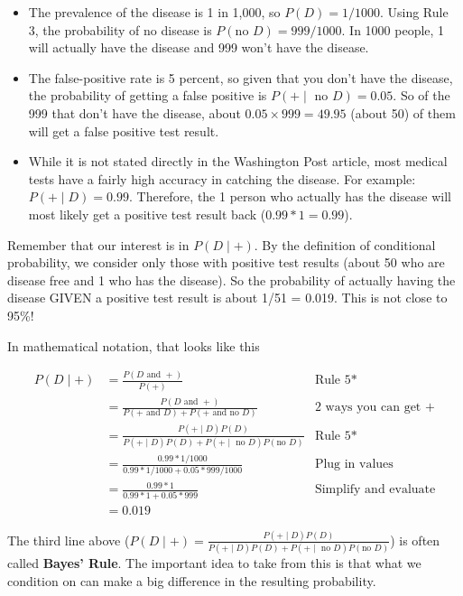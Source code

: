 \documentclass[]{book}
\begin{document}
\begin{itemize}
\item
  The prevalence of the disease is 1 in 1,000, so \(P(D) = 1/1000\). Using Rule 3, the probability of no disease is \(P(\text{no }D) = 999/1000\). In 1000 people, 1 will actually have the disease and 999 won't have the disease.
\item
  The false-positive rate is 5 percent, so given that you don't have the disease, the probability of getting a false positive is \(P(+ \mid\text{ no } D) = 0.05\). So of the 999 that don't have the disease, about \(0.05\times 999 = 49.95\) (about 50) of them will get a false positive test result.
\item
  While it is not stated directly in the Washington Post article, most medical tests have a fairly high accuracy in catching the disease. For example: \(P(+ \mid D) = 0.99\). Therefore, the 1 person who actually has the disease will most likely get a positive test result back (\(0.99*1 = 0.99\)).
\end{itemize}

Remember that our interest is in \(P(D \mid +)\). By the definition of conditional probability, we consider only those with positive test results (about 50 who are disease free and 1 who has the disease). So the probability of actually having the disease GIVEN a positive test result is about 1/51 = 0.019. This is not close to 95\%!

In mathematical notation, that looks like this

\begin{align*}
P(D \mid +) &= \frac{P(D \text{ and } +)}{P(+)} &\text{Rule 5*}\\
&= \frac{P(D \text{ and } +)}{P(+ \text{ and } D) + P(+ \text{ and no } D)} &\text{2 ways you can get +}\\
&= \frac{P(+ \mid D) P(D)}{P( + \mid D) P(D) + P( + \mid \text{ no }D) P(\text{no }D)} &\text{Rule 5*}\\
&= \frac{0.99*1/1000}{0.99*1/1000 + 0.05*999/1000} &\text{Plug in values}\\
&= \frac{0.99*1}{0.99*1 + 0.05*999} &\text{Simplify and evaluate}\\
&= 0.019
\end{align*}

The third line above (\(P(D \mid +) = \frac{P(+ \mid D) P(D)}{P( + \mid D) P(D) + P( + \mid \text{ no }D) P(\text{no }D)}\)) is often called \textbf{Bayes' Rule}. The important idea to take from this is that what we condition on can make a big difference in the resulting probability.
\end{document}
